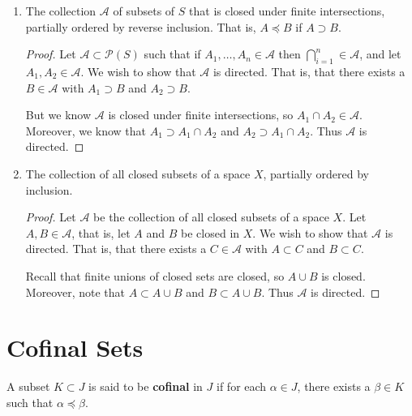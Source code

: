 \documentclass[12pt]{article}
\begin{document}
\begin{enumerate}
\begin{proof}
              Note that $S \in \mathcal P(S)$ and that $A \subset S$ and $B \subset S$. Thus
              $\mathcal P(S)$ is a directed set under inclusion.
          \end{proof}

    \item\label{prob:1c} The collection $\mathcal A$ of subsets of $S$ that is closed under finite
          intersections,
          partially ordered by reverse inclusion. That is, $A \preceq B$ if $A \supset B$.
          \begin{proof}
              Let $\mathcal A \subset \mathcal P(S)$ such that if $A_1, \dots, A_n \in \mathcal A$
              then $\bigcap_{i=1}^n \in \mathcal A$, and let $A_1, A_2 \in \mathcal A$. We wish to
              show that $\mathcal A$ is directed. That is, that there exists a $B \in \mathcal A$
              with $A_1 \supset B$ and $A_2 \supset B$.

              But we know $\mathcal A$ is closed under finite intersections, so
              $A_1 \cap A_2 \in \mathcal A$. Moreover, we know that $A_1 \supset A_1 \cap A_2$ and
              $A_2 \supset A_1 \cap A_2$. Thus $\mathcal A$ is directed.
          \end{proof}

    \item The collection of all closed subsets of a space $X$, partially ordered by inclusion.
          \begin{proof}
              Let $\mathcal A$ be the collection of all closed subsets of a space $X$.
              Let $A, B \in \mathcal A$, that is, let $A$ and $B$ be closed in $X$.
              We wish to show that $\mathcal A$ is directed. That is, that there exists a $C \in
                  \mathcal A$ with $A \subset C$ and $B \subset C$.

              Recall that finite unions of closed sets are closed, so $A \cup B$ is closed.
              Moreover, note that $A \subset A \cup B$ and $B \subset A \cup B$.
              Thus $\mathcal A$ is directed.
          \end{proof}
\end{enumerate}

\section{Cofinal Sets}
\begin{defn}
    A subset $K \subset J$ is said to be \textbf{cofinal} in $J$ if for each $\alpha \in J$, there
    exists a $\beta \in K$ such that $\alpha \preceq \beta$.
\end{defn}
\end{document}
